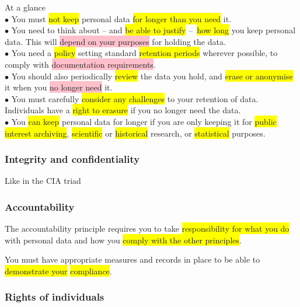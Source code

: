 \documentclass[tikz,border=10pt]{project_plan}
\newcommand{\bulletPoint}{\hspace{-3.1pt}$\bullet$ \hspace{5pt}}
\begin{document}
At a glance\\
\bulletPoint You must \colorbox{yellow}{not keep} personal data \colorbox{yellow}{for longer than you need} it.\\
\bulletPoint You need to think about – and \colorbox{yellow}{be able to justify} – \colorbox{yellow}{how long} you keep personal data. This will \colorbox{pink}{depend on your purposes} for holding the data.\\
\bulletPoint You need a \colorbox{yellow}{policy} setting standard \colorbox{yellow}{retention periods} wherever possible, to comply with \colorbox{pink}{documentation requirements}.\\
\bulletPoint You should also periodically \colorbox{yellow}{review} the data you hold, and \colorbox{yellow}{erase or anonymise} it when you \colorbox{pink}{no longer need} it.\\
\bulletPoint You must carefully \colorbox{yellow}{consider any challenges} to your retention of data. Individuals have a \colorbox{yellow}{right to erasure} if you no longer need the data.\\
\bulletPoint You \colorbox{yellow}{can keep} personal data for longer if you are only keeping it for \colorbox{yellow}{public interest archiving}, \colorbox{yellow}{scientific} or \colorbox{yellow}{historical} research, or \colorbox{yellow}{statistical} purposes.

\subsubsection{Integrity and confidentiality}

Like in the CIA triad

\subsubsection{Accountability}

The accountability principle requires you to take \colorbox{yellow}{responsibility for what you do} with personal data and how you \colorbox{yellow}{comply with the other principles}.

You must have appropriate measures and records in place to be able to \colorbox{yellow}{demonstrate your} \colorbox{yellow}{compliance}.

\subsubsection{Rights of individuals}
\end{document}
